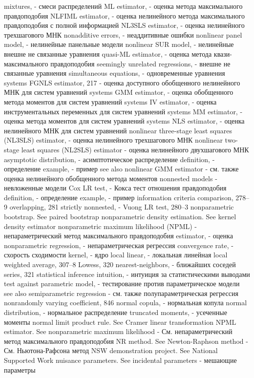 mixtures, - смеси распределений
ML estimator, - оценка метода максимального правдоподобия
NLFIML estimator, - оценка нелинейного метода максимального правдоподобия с полной информацией
NL3SLS estimator, - оценка нелинейного трехшагового МНК
nonadditive errors, - неаддитивные ошибки
nonlinear panel model, - нелинейные панельные модели
nonlinear SUR model, - нелинейные внешне не связанные уравнения
quasi-ML estimator, - оценка метода квази-максимального правдоподобия
seemingly unrelated regressions, - внешне не связанные уравнения
simultaneous equations, - одновременные уравнения
systems FGNLS estimator, 217 - оценка доступного обобщенного нелинейного МНК для систем уравнений
systems GMM estimator, - оценка обобщенного метода моментов для систем уравнений 
systems IV estimator, - оценка инструментальных переменных для систем уравнений
systems MM estimator, - оценка метода моментов для систем уравнений
systems NLS estimator, - оценка нелинейного МНК для систем уравнений
nonlinear three-stage least squares (NL3SLS) estimator, - оценка нелинейного трехшагового МНК 
nonlinear two-stage least squares (NL2SLS) estimator - оценка нелинейного двухшагового МНК
asymptotic distribution, - асимптотическое распределение
definition, - определение
example, - пример
see also nonlinear GMM estimator  - см. также оценка нелинейного обобщенного метода моментов
nonnested models - невложенные модели
Cox LR test, - Кокса тест отношения правдоподобия
definition, - определение
example, - пример
information criteria comparison, 278–9 
overlapping, 281
strictly nonnested, - 
Vuong LR test, 280–3
nonparametric bootstrap. See paired bootstrap nonparametric density estimation. See kernel density
estimator
nonparametric maximum likelihood (NPML) - непараметрический метод максимального правдоподобия
estimator, - оценка
nonparametric regression, - непараметрическая регрессия
convergence rate, - схорость сходимости
kernel, - ядро
local linear, - локальная линейная
local weighted average, 307–8 
Lowess, 320
nearest-neighbors, - ближайших соседей
series, 321
statistical inference intuition, - интуиция за статистическими выводами
test against parametric model, - тестирование против параметрическое модели
see also semiparametric regression - см. также полупараметрическая регрессия
nonrandomly varying coefficient, 846 
normal copula, - нормальная копула
normal distribution, - нормальное распределение
truncated moments, - усеченные моменты
normal limit product rule. See Cramer linear
transformation
NPML estimator. See nonparametric maximum likelihood - См. непараметрический метод максимального правдоподобия
NR method. See Newton-Raphson method - См. Ньютона-Рафсона метод
NSW demonstration project. See National Supported
Work
nuisance parameters. See incidental parameters - мешающие параметры

